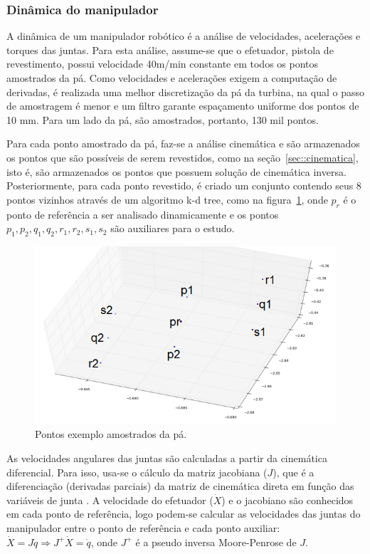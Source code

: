 \subsubsection{Dinâmica do manipulador}
A dinâmica de um manipulador robótico é a análise de velocidades, acelerações e
torques das juntas. Para esta análise, assume-se que o efetuador, pistola de
revestimento, possui velocidade 40m/min constante em todos os pontos amostrados
da pá. Como velocidades e acelerações exigem a computação de derivadas, é
realizada uma melhor discretização da pá da turbina, na qual o passo de
amostragem é menor e um filtro garante espaçamento uniforme dos pontos de 10 mm.
Para um lado da pá, são amostrados, portanto, 130 mil pontos.

Para cada ponto amostrado da pá, faz-se a análise cinemática e são armazenados
os pontos que são possíveis de serem revestidos, como na
seção~\ref{sec::cinematica}, isto é, são armazenados os pontos que possuem
solução de cinemática inversa. Posteriormente, para cada ponto revestido, é
criado um conjunto contendo seus 8 pontos vizinhos através de um algoritmo k-d
tree, como na figura~\ref{fig::pontosdin}, onde $p_r$ é o ponto de referência a
ser analisado dinamicamente e os pontos ${p_1,p_2,q_1,q_2,r_1,r_2,s_1,s_2}$ são auxiliares
para o estudo. 

\begin{figure}[h!]	
	\includegraphics[width=\columnwidth]{figs/dinamica/pontosdinamica.png}
	\caption{Pontos exemplo amostrados da pá.}
	\label{fig::pontosdin}
\end{figure}

As velocidades angulares das juntas são calculadas a partir da cinemática
diferencial. Para isso, usa-se o cálculo da matriz jacobiana ($J$), que é a
diferenciação (derivadas parciais) da matriz de cinemática direta em função das
variáveis de junta \citep{sciavicco2000differential}. A velocidade do efetuador
($\dot{X}$) e o jacobiano são conhecidos em cada ponto de referência, logo
podem-se calcular as velocidades das juntas do manipulador entre o ponto de
referência e cada ponto auxiliar: $\dot{X} = J\dot{q}\Rightarrow
J^+\dot{X}=\dot{q}$, onde $J^+$ é a pseudo inversa Moore-Penrose de $J$.

